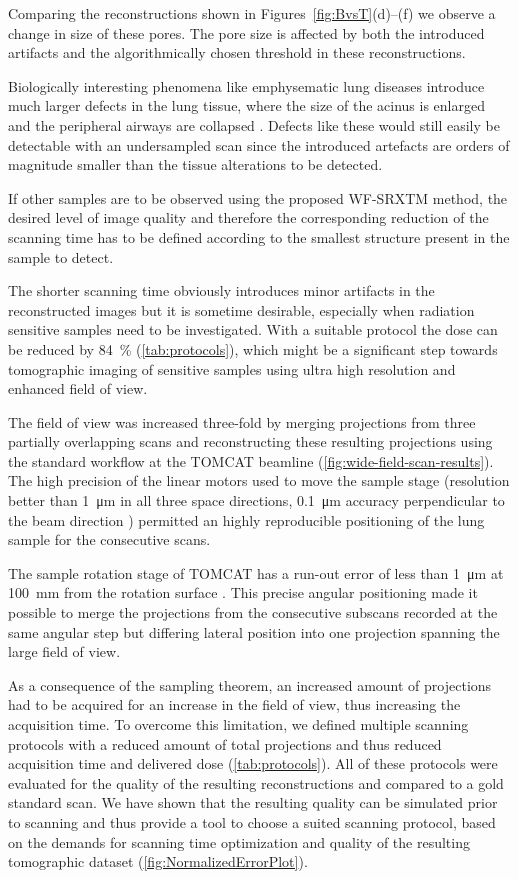 Comparing the reconstructions shown in Figures~\ref{fig:BvsT}(d)--(f) we observe a change in size of these pores. The pore size is affected by both the introduced artifacts and the algorithmically chosen threshold in these reconstructions.

Biologically interesting phenomena like emphysematic lung diseases introduce much larger defects in the lung tissue, where the size of the acinus is enlarged and the peripheral airways are collapsed \cite{Weibel2009}. Defects like these would still easily be detectable with an undersampled scan since the introduced artefacts are orders of magnitude smaller than the tissue alterations to be detected.

If other samples are to be observed using the proposed WF-SRXTM method, the desired level of image quality and therefore the corresponding reduction of the scanning time has to be defined according to the smallest structure present in the sample to detect.

The shorter scanning time obviously introduces minor artifacts in the reconstructed images but it is sometime desirable, especially when radiation sensitive samples need to be investigated. With a suitable protocol the dose can be reduced by \SI{84}{\percent} (\autoref{tab:protocols}), which might be a significant step towards tomographic imaging of sensitive samples using ultra high resolution and enhanced field of view. 

The field of view was increased three-fold by merging projections from three partially overlapping scans and reconstructing these resulting projections using the standard workflow at the TOMCAT beamline (\autoref{fig:wide-field-scan-results}). The high precision of the linear motors used to move the sample stage (resolution better than \SI{1}{\micro\meter} in all three space directions, \SI{0.1}{\micro\meter} accuracy perpendicular to the beam direction \cite{Stampanoni2006a}) permitted an highly reproducible positioning of the lung sample for the consecutive scans.

The sample rotation stage of TOMCAT has a run-out error of less than \SI{1}{\micro\meter} at \SI{100}{\milli\meter} from the rotation surface \cite{Stampanoni2006a}. This precise angular positioning made it possible to merge the projections from the consecutive subscans recorded at the same angular step but differing lateral position into one projection spanning the large field of view.

As a consequence of the sampling theorem, an increased amount of projections had to be acquired for an increase in the field of view, thus increasing the acquisition time. To overcome this limitation, we defined multiple scanning protocols with a reduced amount of total projections and thus reduced acquisition time and delivered dose (\autoref{tab:protocols}). All of these protocols were evaluated for the quality of the resulting reconstructions and compared to a gold standard scan. We have shown that the resulting quality can be simulated prior to scanning and thus provide a tool to choose a suited scanning protocol, based on the demands for scanning time optimization and quality of the resulting tomographic dataset (\autoref{fig:NormalizedErrorPlot}). 

